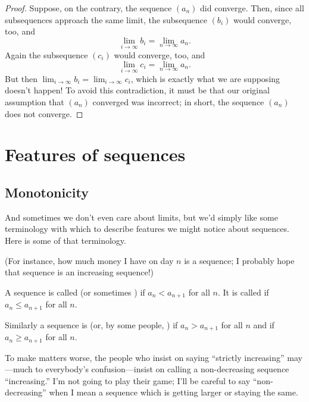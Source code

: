 \documentclass{ximera}
\begin{document}
\begin{proof}
  Suppose, on the contrary, the sequence $(a_n)$ did converge.  Then,
  since all subsequences approach the same limit, the subsequence
  $(b_i)$ would converge, too, and
  $$
  \lim_{i \to \infty} b_i = \lim_{n \to \infty} a_n.
  $$
  Again %
  the subsequence
  $(c_i)$ would converge, too, and
  $$
  \lim_{i \to \infty} c_i = \lim_{n \to \infty} a_n.
  $$
  But then $\lim_{i \to \infty} b_i = \lim_{i \to \infty} c_i$,
  which is exactly what we are supposing doesn't happen!  To avoid
  this contradiction, it must be that our original assumption that
  $(a_n)$ converged was incorrect; in short, the sequence $(a_n)$ does
  not converge.
\end{proof}


\section{Features of sequences}

\subsection{Monotonicity}

And sometimes we don't even care about limits, but we'd simply like
some terminology with which to describe features we might notice about
sequences.  Here is some of that terminology.

(For instance, how much money I have on day $n$ is a sequence; I
probably hope that sequence is an increasing sequence!)

\begin{definition}
  A sequence is called  (or
  sometimes ) if $ a_n<a_{n+1}$ for all $n$.
  It is called  if $
  a_n\le a_{n+1}$ for all $n$.

  Similarly a sequence is 
  (or, by some people, ) if $ a_n>a_{n+1}$
  for all $n$ and  if
  $ a_n\ge a_{n+1}$ for all $n$.
\end{definition}
To make matters worse, the people who insist on saying ``strictly
increasing'' may---much to everybody's confusion---insist on calling a
non-decreasing sequence ``increasing.'' I'm not going to play their
game; I'll be careful to say ``non-decreasing'' when I mean a sequence
which is getting larger or staying the same.
\end{document}
